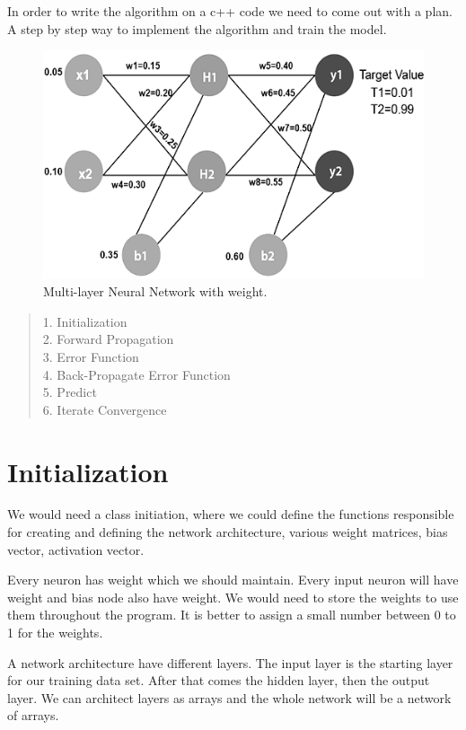 \documentclass[12pt]{article}
\begin{document}
In order to write the algorithm on a c++ code we need to come out with a plan. A step by step way to implement the algorithm and train the model.

\begin{figure}
	\includegraphics[width=\linewidth]{images/layers-weight.png}
	\caption{Multi-layer Neural Network with weight.}
	\label{fig:layer-weight}
\end{figure}

\begin{quote}
1. Initialization\\
2. Forward Propagation\\
3. Error Function\\
4. Back-Propagate Error Function\\
5. Predict\\
6. Iterate Convergence\\
\end{quote}  


\section{Initialization}
We would need a class initiation, where we could define the functions responsible for creating and defining the network architecture, various weight matrices, bias vector, activation vector.

Every neuron has weight which we should maintain. Every input neuron will have weight and bias node also have weight. We would need to store the weights to use them throughout the program. It is better to assign a small number between 0 to 1 for the weights.

A network architecture have different layers. The input layer is the starting layer for our training data set. After that comes the hidden layer, then the output layer. We can architect layers as arrays and the whole network will be a network of arrays.
\end{document}
